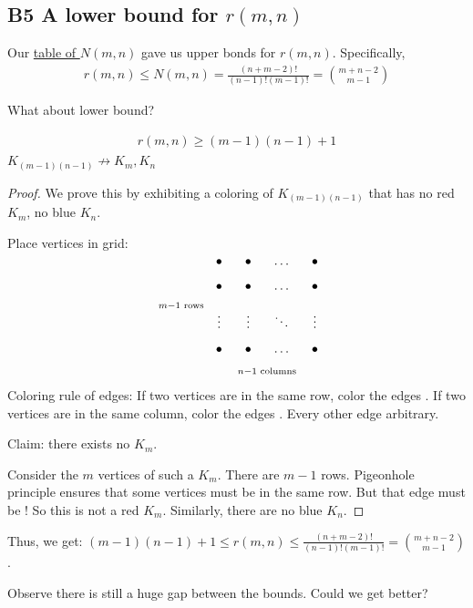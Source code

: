 \documentclass[12pt]{article}
\begin{document}
\subsection{B5 A lower bound for $r(m,n)$}
Our \hyperlink{tableforN}{table of $N(m,n)$} gave us upper bonds for $r(m,n)$. Specifically, \begin{align*}
    r(m,n)\leq N(m,n)=\frac{(n+m-2)!}{(n-1)!(m-1)!}=
   {{m+n-2}\choose{m-1}}
\end{align*}

What about lower bound?

\begin{theorem}
    \begin{align*}
        r(m,n)\geq (m-1)(n-1)+1
    \end{align*}
    \ifnif $K_{(m-1)(n-1)}\not\to K_m, K_n$
\end{theorem}

\begin{proof}
    We prove this by exhibiting a coloring of $K_{(m-1)(n-1)}$ that has no red $K_m$, no blue $K_n$.
    
    Place vertices in grid:
    \[\begin{tikzcd}[ampersand replacement=\&,cramped,sep=small]
        \bullet \& \bullet \& \dots \& \bullet \\
        \bullet \& \bullet \& \dots \& \bullet \\
        \vdots \& \vdots \& \ddots \& \vdots \\
        \bullet \& \bullet \& \dots \& \bullet
        \arrow["{m-1\text{ rows}}"', shift right=4, draw=none, from=1-1, to=4-1]
        \arrow["{n-1\text{ columns}}"', shift right=5, draw=none, from=4-1, to=4-4]
    \end{tikzcd}\]
    Coloring rule of edges: If two vertices are in the same row, color the edges . If two vertices are in the same column, color the edges . Every other edge arbitrary.

    Claim: there exists no  $K_m$.

    Consider the $m$ vertices of such a $K_m$. There are $m-1$ rows. Pigeonhole principle ensures that some vertices must be in the same row. But that edge must be ! So this is not a red $K_m$. Similarly, there are no blue $K_n$.
\end{proof}

Thus, we get: $\displaystyle (m-1)(n-1)+1\leq r(m,n)\leq \frac{(n+m-2)!}{(n-1)!(m-1)!}=
{{m+n-2}\choose{m-1}}$.

Observe there is still a huge gap between the bounds. Could we get better?
\end{document}

